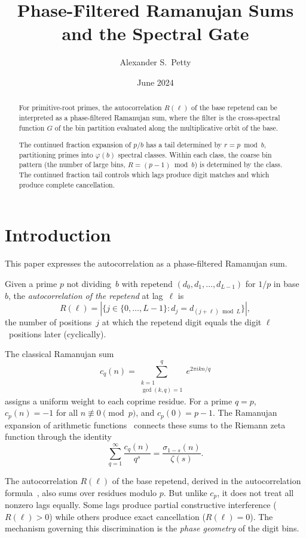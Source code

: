 \documentclass[12pt]{amsart}
\title{Phase-Filtered Ramanujan Sums\\and the Spectral Gate}
\author{Alexander S.\ Petty}
\date{June 2024}
\theoremstyle{definition}
\theoremstyle{remark}
\begin{document}
\begin{abstract}
For primitive-root primes, the autocorrelation
$R(\ell)$ of the base repetend can be interpreted as a
phase-filtered Ramanujan sum, where the filter is the
cross-spectral function $G$ of the bin partition
evaluated along the multiplicative orbit of the base.

The continued fraction expansion of $p/b$ has a tail
determined by $r = p \bmod b$, partitioning primes into
$\varphi(b)$ spectral classes. Within each class, the
coarse bin pattern (the number of large bins,
$R = (p{-}1) \bmod b$) is determined by the class. The
continued fraction tail controls which lags produce
digit matches and which produce complete cancellation.
\end{abstract}
\maketitle

\section{Introduction}

This paper expresses the autocorrelation as a phase-filtered Ramanujan sum.

Given a prime $p$ not dividing~$b$ with repetend
$(d_0, d_1, \ldots, d_{L-1})$ for $1/p$ in base~$b$, the
\emph{autocorrelation of the repetend} at lag~$\ell$ is
\[
R(\ell) = |\{j \in \{0, \ldots, L{-}1\} : d_j = d_{(j+\ell) \bmod L}\}|,
\]
the number of positions~$j$ at which the repetend digit equals the
digit $\ell$~positions later (cyclically).

The classical Ramanujan sum~\cite{ramanujan}
\[
c_q(n) = \sum_{\substack{k=1 \\ \gcd(k,q)=1}}^{q}
e^{2\pi i kn/q}
\]
assigns a uniform weight to each coprime residue. For a prime $q =
p$, $c_p(n) = -1$ for all $n \not\equiv 0 \pmod{p}$, and
$c_p(0) = p - 1$. The Ramanujan expansion of arithmetic functions~\cite{hardy_ramanujan}
connects these sums to the Riemann zeta function through the
identity
\[
\sum_{q=1}^{\infty} \frac{c_q(n)}{q^s}
= \frac{\sigma_{1-s}(n)}{\zeta(s)}.
\]

The autocorrelation $R(\ell)$ of the base repetend, derived in
the autocorrelation formula~\cite{paper9}, also sums over residues
modulo $p$. But unlike $c_p$, it
does not treat all nonzero lags equally. Some lags produce partial
constructive interference ($R(\ell) > 0$) while others produce
exact cancellation ($R(\ell) = 0$). The mechanism governing this
discrimination is the \emph{phase geometry} of the digit bins.
\end{document}
